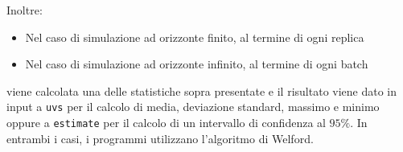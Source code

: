 Inoltre:
\begin{itemize}
\item Nel caso di simulazione ad orizzonte finito, al termine di ogni replica 
\item Nel caso di simulazione ad orizzonte infinito, al termine di ogni batch
\end{itemize}
viene calcolata una delle statistiche sopra presentate e il risultato viene dato in input a \texttt{uvs} per il calcolo di media, deviazione standard, massimo e minimo oppure a \texttt{estimate} per il calcolo di un intervallo di confidenza al $95\%$. In entrambi i casi, i programmi utilizzano l'algoritmo di Welford.